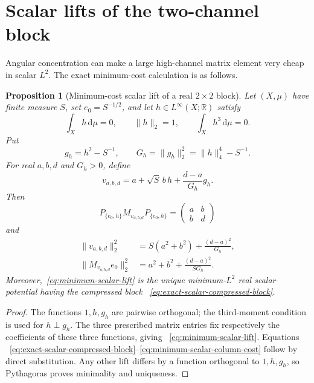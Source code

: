 \documentclass[11pt]{article}
\newcommand{\dd}{\,\mathrm d}
\newtheorem{proposition}[theorem]{Proposition}
\theoremstyle{definition}
\theoremstyle{remark}
\begin{document}
\section{Scalar lifts of the two-channel block}
\label{app:scalar-block-lift}

Angular concentration can make a large high-channel matrix element very cheap
in scalar $L^2$.  The exact minimum-cost calculation is as follows.

\begin{proposition}[Minimum-cost scalar lift of a real $2\times2$ block]
\label{prop:minimum-scalar-block-lift}
Let $(X,\mu)$ have finite measure $S$, set $e_0=S^{-1/2}$, and let
$h\in L^\infty(X;\mathbb R)$ satisfy
\begin{equation}
 \int_Xh\dd\mu=0,\qquad \|h\|_2=1,\qquad
 \int_Xh^3\dd\mu=0.
\end{equation}
Put
\begin{equation}
 g_h=h^2-S^{-1},\qquad
 G_h=\|g_h\|_2^2=\|h\|_4^4-S^{-1}.
 \label{eq:scalar-lift-G}
\end{equation}
For real $a,b,d$ and $G_h>0$, define
\begin{equation}
 v_{a,b,d}
 =a+\sqrt S\,b\,h+\frac{d-a}{G_h}g_h.
 \label{eq:minimum-scalar-lift}
\end{equation}
Then
\begin{equation}
 P_{\{e_0,h\}}M_{v_{a,b,d}}P_{\{e_0,h\}}
 =\begin{pmatrix}a&b\\b&d\end{pmatrix}
 \label{eq:exact-scalar-compressed-block}
\end{equation}
and
\begin{align}
 \|v_{a,b,d}\|_2^2
 &=S(a^2+b^2)+\frac{(d-a)^2}{G_h},\label{eq:minimum-scalar-L2}\\
 \|M_{v_{a,b,d}}e_0\|_2^2
 &=a^2+b^2+\frac{(d-a)^2}{SG_h}.
 \label{eq:minimum-scalar-column-cost}
\end{align}
Moreover,~\eqref{eq:minimum-scalar-lift} is the unique minimum-$L^2$ real
scalar potential having the compressed block
~\eqref{eq:exact-scalar-compressed-block}.
\end{proposition}

\begin{proof}
The functions $1,h,g_h$ are pairwise orthogonal; the third-moment condition is
used for $h\perp g_h$.  The three prescribed matrix entries fix respectively
the coefficients of these three functions, giving
~\eqref{eq:minimum-scalar-lift}.  Equations
~\eqref{eq:exact-scalar-compressed-block}--\eqref{eq:minimum-scalar-column-cost}
follow by direct substitution.  Any other lift differs by a function
orthogonal to $1,h,g_h$, so Pythagoras proves minimality and uniqueness.
\end{proof}
\end{document}
